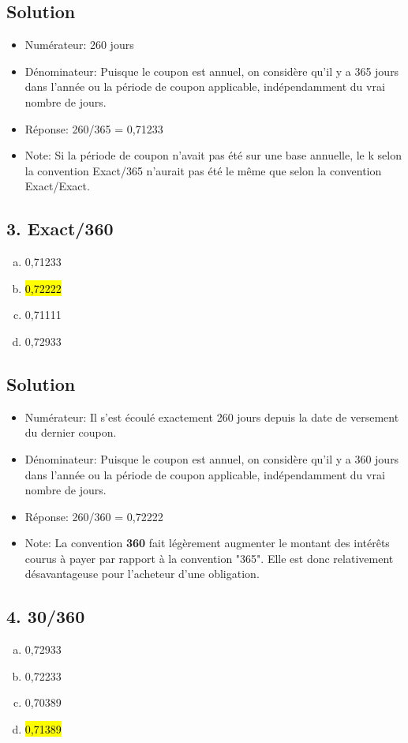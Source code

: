 \documentclass[10pt,a4paper]{article}
\begin{document}
\subsection*{Solution}
\begin{itemize}
\item Numérateur: 260 jours
\item Dénominateur: Puisque le coupon est annuel, on considère qu'il y a 365 jours dans l'année ou la période de coupon applicable, indépendamment du vrai nombre de jours.
\item Réponse: 260/365 = 0,71233
\item Note: Si la période de coupon n'avait pas été sur une base annuelle, le k selon la convention Exact/365 n'aurait pas été le même que selon la convention Exact/Exact.
\end{itemize}

\newpage 

\subsection*{3. Exact/360}
\begin{enumerate}[a)]
\item 0,71233
\item \hl{0,72222}
\item 0,71111
\item 0,72933
\end{enumerate}

\subsection*{Solution}
\begin{itemize}
\item Numérateur: Il s'est écoulé exactement 260 jours depuis la date de versement du dernier coupon.
\item Dénominateur: Puisque le coupon est annuel, on considère qu'il y a 360 jours dans l'année ou la période de coupon applicable, indépendamment du vrai nombre de jours.
\item Réponse: 260/360 = 0,72222
\item Note: La convention \textbf{360} fait légèrement augmenter le montant des intérêts courus à payer par rapport à la convention "365". Elle est donc relativement désavantageuse pour l'acheteur d'une obligation.
\end{itemize}

\newpage  

\subsection*{4. 30/360}
\begin{enumerate}[a)]
\item 0,72933
\item 0,72233
\item 0,70389
\item \hl{0,71389}
\end{enumerate}
\end{document}
